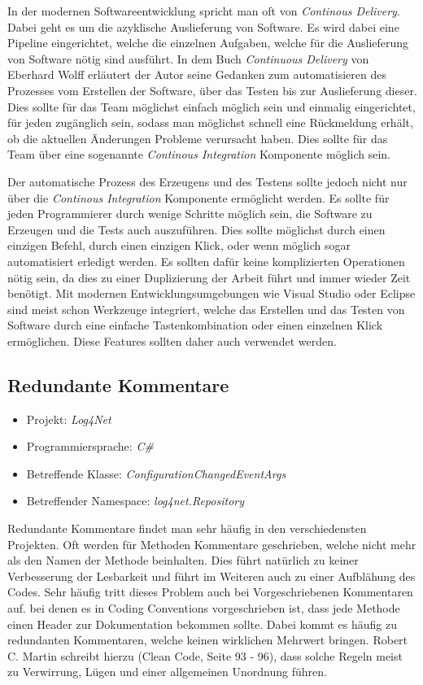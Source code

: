 \SuperPar In der modernen Softwareentwicklung spricht man oft von \textit{Continous Delivery}. Dabei geht es um die azyklische Auslieferung von Software. Es wird dabei eine Pipeline eingerichtet, welche die einzelnen Aufgaben, welche für die Auslieferung von Software nötig sind ausführt. In dem Buch \textit{Continuous Delivery} von Eberhard Wolff erläutert der Autor seine Gedanken zum automatisieren des Prozesses vom Erstellen der Software, über das Testen bis zur Auslieferung dieser. Dies sollte für das Team möglichst einfach möglich sein und einmalig eingerichtet, für jeden zugänglich sein, sodass man möglichst schnell eine Rückmeldung erhält, ob die aktuellen Änderungen Probleme verursacht haben. Dies sollte für das Team über eine sogenannte \textit{Continous Integration} Komponente möglich sein.

\SuperPar Der automatische Prozess des Erzeugens und des Testens sollte jedoch nicht nur über die \textit{Continous Integration} Komponente ermöglicht werden. Es sollte für jeden Programmierer durch wenige Schritte möglich sein, die Software zu Erzeugen und die Tests auch auszuführen. Dies sollte möglichst durch einen einzigen Befehl, durch einen einzigen Klick, oder wenn möglich sogar automatisiert erledigt werden. Es sollten dafür keine komplizierten Operationen nötig sein, da dies zu einer Duplizierung der Arbeit führt und immer wieder Zeit benötigt. Mit modernen Entwicklungsumgebungen wie Visual Studio oder Eclipse sind meist schon Werkzeuge integriert, welche das Erstellen und das Testen von Software durch eine einfache Tastenkombination oder einen einzelnen Klick ermöglichen. Diese Features sollten daher auch verwendet werden.

\subsection{Redundante Kommentare}
\begin{itemize}
	\item Projekt: \textit{Log4Net}
	\item Programmiersprache: \textit{C\#}
	\item Betreffende Klasse: \textit{ConfigurationChangedEventArgs}
	\item Betreffender Namespace: \textit{log4net.Repository}
\end{itemize}

\SuperPar Redundante Kommentare findet man sehr häufig in den verschiedensten Projekten. Oft werden für Methoden Kommentare geschrieben, welche nicht mehr als den Namen der Methode beinhalten. Dies führt natürlich zu keiner Verbesserung der Lesbarkeit und führt im Weiteren auch zu einer Aufblähung des Codes. Sehr häufig tritt dieses Problem auch bei Vorgeschriebenen Kommentaren auf. bei denen es in Coding Conventions vorgeschrieben ist, dass jede Methode einen Header zur Dokumentation
bekommen sollte. Dabei kommt es häufig zu redundanten Kommentaren, welche keinen wirklichen Mehrwert bringen. Robert C. Martin schreibt hierzu (Clean Code, Seite 93 - 96), dass solche Regeln meist zu Verwirrung, Lügen und einer allgemeinen Unordnung führen. 

